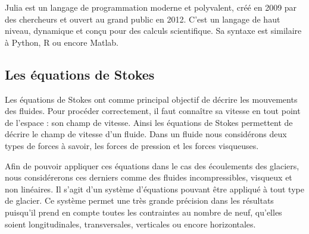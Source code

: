 \documentclass{article}
\begin{document}
Julia est un langage de programmation moderne et polyvalent, créé en 2009 par des chercheurs et ouvert au grand public en 2012. C'est un langage de haut niveau, dynamique et conçu pour des calculs scientifique. Sa syntaxe est similaire à Python, R ou encore Matlab.
 


\subsection{Les équations de Stokes}

Les équations de Stokes \cite{site1} ont comme principal objectif de décrire les mouvements des fluides. 
Pour procéder correctement, il faut connaître sa vitesse en tout point de l'espace : son champ de vitesse. Ainsi les équations de Stokes permettent de décrire le champ de vitesse d'un fluide. 
Dans un fluide nous considérons deux types de forces à savoir, les forces de pression et les forces visqueuses. 

Afin de pouvoir appliquer ces équations dans le cas des écoulements des glaciers, nous considérerons ces derniers comme des fluides incompressibles, visqueux et non linéaires. Il s'agit d'un système d'équations pouvant être appliqué à tout type de glacier.
\newpage
Ce système permet une très grande précision dans les résultats puisqu'il prend en compte toutes les contraintes au nombre de neuf, qu’elles soient longitudinales, transversales, verticales ou encore horizontales. 
\end{document}
